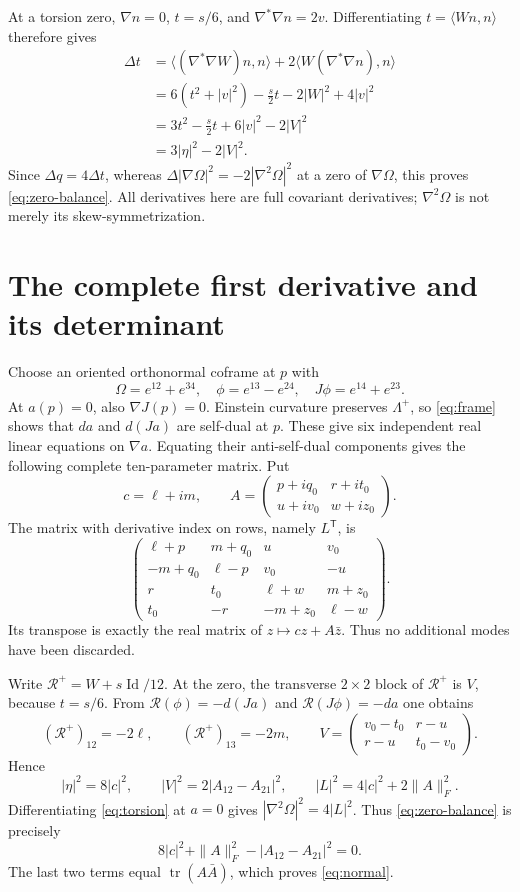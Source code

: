 \documentclass[11pt]{article}
\theoremstyle{remark}\newtheorem{remark}[theorem]{Remark}
\newcommand{\tr}{\operatorname{tr}}
\newcommand{\Id}{\operatorname{Id}}
\begin{document}
At a torsion zero, $\nabla n=0$, $t=s/6$, and
$\nabla^*\nabla n=2v$. Differentiating $t=\langle Wn,n\rangle$
therefore gives
\begin{align*}
 \Delta t
 &=\langle(\nabla^*\nabla W)n,n\rangle
          +2\langle W(\nabla^*\nabla n),n\rangle\\
 &=6(t^2+|v|^2)-\frac{s}{2}t-2|W|^2+4|v|^2\\
 &=3t^2-\frac{s}{2}t+6|v|^2-2|V|^2\\
 &=3|\eta|^2-2|V|^2.
\end{align*}
Since $\Delta q=4\Delta t$, whereas
$\Delta|\nabla\Omega|^2=-2|\nabla^2\Omega|^2$ at a zero of
$\nabla\Omega$, this proves \eqref{eq:zero-balance}. All derivatives
here are full covariant derivatives; $\nabla^2\Omega$ is not merely
its skew-symmetrization.

\section{The complete first derivative and its determinant}
Choose an oriented orthonormal coframe at $p$ with
\[
 \Omega=e^{12}+e^{34},\quad
 \phi=e^{13}-e^{24},\quad J\phi=e^{14}+e^{23}.
\]
At $a(p)=0$, also $\nabla J(p)=0$. Einstein curvature preserves
$\Lambda^+$, so \eqref{eq:frame} shows that $da$ and $d(Ja)$ are
self-dual at $p$. These give six independent real linear equations on
$\nabla a$. Equating their anti-self-dual components gives the following
complete ten-parameter matrix. Put
\[
 c=\ell+i m,\qquad
 A=\begin{pmatrix}p+i q_0&r+i t_0\\u+i v_0&w+i z_0\end{pmatrix}.
\]
The matrix with derivative index on rows, namely $L^{\mathsf T}$, is
\begin{equation}
 \begin{pmatrix}
 \ell+p&m+q_0&u&v_0\\
 -m+q_0&\ell-p&v_0&-u\\
 r&t_0&\ell+w&m+z_0\\
 t_0&-r&-m+z_0&\ell-w
 \end{pmatrix}.\label{eq:real-matrix}
\end{equation}
Its transpose is exactly the real matrix of $z\mapsto cz+A\bar z$.
Thus no additional modes have been discarded.

Write $\mathcal R^+=W+s\Id/12$. At the zero, the transverse
$2\times2$ block of $\mathcal R^+$ is $V$, because $t=s/6$.
From $\mathcal R(\phi)=-d(Ja)$ and
$\mathcal R(J\phi)=-da$ one obtains
\[
 (\mathcal R^+)_{12}=-2\ell,\qquad
 (\mathcal R^+)_{13}=-2m,\qquad
 V=\begin{pmatrix}v_0-t_0&r-u\\r-u&t_0-v_0\end{pmatrix}.
\]
Hence
\begin{equation}
 |\eta|^2=8|c|^2,\qquad
 |V|^2=2|A_{12}-A_{21}|^2,\qquad
 |L|^2=4|c|^2+2\|A\|_F^2.\label{eq:norms}
\end{equation}
Differentiating \eqref{eq:torsion} at $a=0$ gives
$|\nabla^2\Omega|^2=4|L|^2$. Thus \eqref{eq:zero-balance}
is precisely
\[
 8|c|^2+\|A\|_F^2-|A_{12}-A_{21}|^2=0.
\]
The last two terms equal $\tr(A\bar A)$, which proves
\eqref{eq:normal}.
\end{document}

